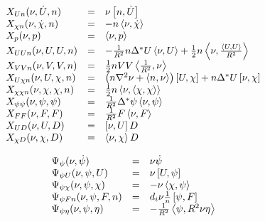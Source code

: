 \begin{equation}
  \begin{array}{lcl}
    X_{U n}(\nu, \dot U, n) & = & \nu \left[n,\dot{U}\right]
    \\
    X_{\chi n}(\nu, \dot \chi, n) & = & -n \left\langle \nu,\dot{\chi}\right\rangle
    \\
    X_p(\nu, p) & = & \left\langle \nu,p\right\rangle
    \\
    X_{U U n}(\nu, U, U, n) & = & -\frac{1}{R^2} n \Delta^* U \left\langle \nu,U\right\rangle
      + \frac{1}{2} n \left\langle \nu,\frac{\left\langle U,U\right\rangle}{R^2}\right\rangle
    \\
    X_{V V n}(\nu, V,  V, n) & = & 
      \frac{1}{2} n V V \left\langle \frac{1}{R^2},\nu\right\rangle
    \\
    X_{U \chi n}(\nu, U, \chi, n) & = & 
      \left( n \nabla^2 \nu + \left\langle n,\nu\right\rangle \right) \left[U,\chi\right]
      + n \Delta^* U \left[\nu,\chi\right]
    \\
    X_{\chi \chi n}(\nu, \chi, \chi, n) & = & \frac{1}{2} n 
      \left\langle \nu,\left\langle \chi,\chi\right\rangle\right\rangle
    \\
    X_{\psi \psi}(\nu, \psi, \psi) & = & 
      \frac{1}{R^2} \Delta^* \psi \left\langle \nu,\psi\right\rangle
    \\
    X_{F F}(\nu, F, F) & = & \frac{1}{R^2} F \left\langle \nu,F\right\rangle
    \\
    X_{U D}(\nu, U, D) & = & \left[\nu,U\right] D
    \\
    X_{\chi D}(\nu, \chi, D) & = & \left\langle \nu,\chi\right\rangle D
  \end{array}
\end{equation}


\begin{equation}
  \begin{array}{lcl}
    \Psi_{\psi}(\nu, \dot{\psi}) & = & \nu \dot{\psi}\\
    \Psi_{\psi U}(\nu, \psi, U) & = & \nu \left[U,\psi\right]\\
    \Psi_{\psi \chi}(\nu, \psi, \chi) & = & -\nu \left\langle \chi,\psi\right\rangle\\
    \Psi_{\psi F n}(\nu, \psi, F, n) & = & d_i \nu \frac{1}{n} \left[\psi,F\right]\\
    \Psi_{\psi \eta}(\nu, \psi, \eta) & = & 
        -\frac{1}{R^2} \left\langle \psi,R^2 \nu \eta\right\rangle 
  \end{array}
\end{equation}


